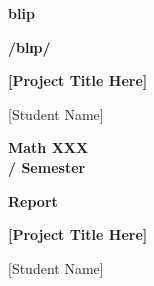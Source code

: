 \pagecolor{white}\afterpage{\nopagecolor}

\vspace{1.5in}

\begin{singlespace}
\fontsize{80}{65}\selectfont \textcolor{FSBlue}{\textbf{blip }} \fontsize{60}{65}\selectfont{(n)}

\fontsize{30}{45}\selectfont \textcolor{FSBlue}{\textbf{/blɪp/}}

\vspace{10mm}
\fontsize{40}{45}\selectfont
\textcolor{FSBlue}{\textbf{[Project Title Here]}}

\vspace{0.5in}

\Large\textcolor{FSBlue}{[Student Name]}

\vspace{2in}

\end{singlespace}

\thispagestyle{empty}
\restoregeometry   
\newpage

\pagecolor{white}\afterpage{\nopagecolor}

\vspace{1.5in}

\begin{singlespace}
\fontsize{60}{65}\selectfont \textcolor{FSBlue}{\textbf{Math XXX\\ / Semester}}

\fontsize{60}{65}\selectfont \textcolor{FSBlue}{\textbf{Report}}

\vspace{10mm}
\LARGE\textcolor{FSBlue}{\textbf{[Project Title Here]}}

\vspace{0.5in}

\Large\textcolor{FSBlue}{[Student Name]}

\vspace{2in}

\end{singlespace}

\thispagestyle{empty}
\restoregeometry   
\newpage